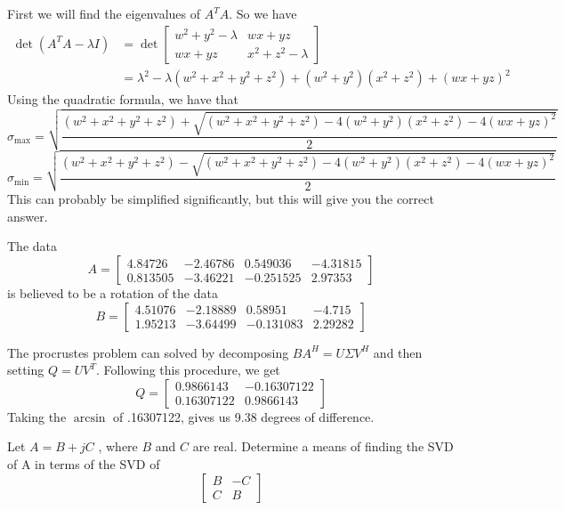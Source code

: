 \documentclass{homework}
\begin{document}
\begin{solution}
  First we will find the eigenvalues of $A^TA$. So we have
  \[ 
    \begin{aligned}
      \det(A^TA - \lambda I) &= \det 
    \begin{bmatrix}
      w^2 + y^2 - \lambda & wx + yz \\
      wx + yz & x^2 + z^2 - \lambda
    \end{bmatrix} \\ 
    &= \lambda^2 - \lambda(w^2 + x^2 + y^2 + z^2) + (w^2 + y^2)(x^2 + z^2) + (wx + yz)^2
    \end{aligned}
  \]
  Using the quadratic formula, we have that
  \[ \sigma_{\max} = \sqrt{\frac{(w^2 + x^2 + y^2 + z^2) + \sqrt{(w^2 + x^2 + y^2 + z^2) - 4(w^2 + y^2)(x^2 + z^2) - 4(wx + yz)^2}}{2}}\]
  \[ \sigma_{\min} = \sqrt{\frac{(w^2 + x^2 + y^2 + z^2) - \sqrt{(w^2 + x^2 + y^2 + z^2) - 4(w^2 + y^2)(x^2 + z^2) - 4(wx + yz)^2}}{2}}\]
  This can probably be simplified significantly, but this will give you the correct answer.
\end{solution}

\begin{problem}[7-15]
  The data
  \[A=
    \begin{bmatrix}
    4.84726 & -2.46786 & 0.549036 & -4.31815 \\
    0.813505 & -3.46221 & -0.251525 & 2.97353
    \end{bmatrix}
  \]
  is believed to be a rotation of the data
  \[B=
    \begin{bmatrix}
    4.51076 & -2.18889 & 0.58951 & -4.715 \\
    1.95213 & -3.64499 & -0.131083 & 2.29282
    \end{bmatrix}
  \]
\end{problem}

\begin{solution}
  The procrustes problem can solved by decomposing $BA^H = U\Sigma V^H$ and then setting $Q = UV^T$. Following this procedure, we get
  \[ Q =
    \begin{bmatrix}
      0.9866143 & -0.16307122 \\
      0.16307122 & 0.9866143
    \end{bmatrix}
  \]
  Taking the $\arcsin$ of .16307122, gives us 9.38 degrees of difference.
\end{solution}

\begin{problem}[7-17]
  Let $A = B + jC$ , where $B$ and $C$ are real. Determine a means of finding the SVD of A in terms of the SVD of
  \[
    \begin{bmatrix}
      B & -C \\
      C & B
    \end{bmatrix}
  \]
\end{problem}
\end{document}
